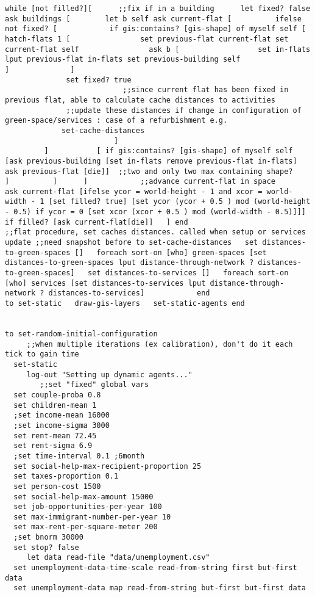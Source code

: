 \documentclass[english]{article}
\begin{document}
\begin{lstlisting}[basicstyle={\scriptsize}]
while [not filled?][      ;;fix if in a building      let fixed? false      ask buildings [        let b self ask current-flat [          ifelse not fixed? [            if gis:contains? [gis-shape] of myself self [              hatch-flats 1 [                set previous-flat current-flat set current-flat self                ask b [                  set in-flats lput previous-flat in-flats set previous-building self                ]              ]
              set fixed? true
                           ;;since current flat has been fixed in previous flat, able to calculate cache distances to activities
              ;;update these distances if change in configuration of green-space/services : case of a refurbishment e.g.
             set-cache-distances
                         ]
         ]           [ if gis:contains? [gis-shape] of myself self [ask previous-building [set in-flats remove previous-flat in-flats] ask previous-flat [die]]  ;;two and only two max containing shape?               ]          ]      ]            ;;advance current-flat in space      ask current-flat [ifelse ycor = world-height - 1 and xcor = world-width - 1 [set filled? true] [set ycor (ycor + 0.5 ) mod (world-height - 0.5) if ycor = 0 [set xcor (xcor + 0.5 ) mod (world-width - 0.5)]]]      if filled? [ask current-flat[die]]   ] end
;;flat procedure, set caches distances. called when setup or services update ;;need snapshot before to set-cache-distances   set distances-to-green-spaces []   foreach sort-on [who] green-spaces [set distances-to-green-spaces lput distance-through-network ? distances-to-green-spaces]   set distances-to-services []   foreach sort-on [who] services [set distances-to-services lput distance-through-network ? distances-to-services]            end
to set-static   draw-gis-layers   set-static-agents end


to set-random-initial-configuration
     ;;when multiple iterations (ex calibration), don't do it each tick to gain time
  set-static
     log-out "Setting up dynamic agents..."
        ;;set "fixed" global vars
  set couple-proba 0.8
  set children-mean 1
  ;set income-mean 16000
  ;set income-sigma 3000
  set rent-mean 72.45
  set rent-sigma 6.9
  ;set time-interval 0.1 ;6month
  set social-help-max-recipient-proportion 25
  set taxes-proportion 0.1
  set person-cost 1500
  set social-help-max-amount 15000
  set job-opportunities-per-year 100
  set max-immigrant-number-per-year 10
  set max-rent-per-square-meter 200
  ;set bnorm 30000
  set stop? false
     let data read-file "data/unemployment.csv"
  set unemployment-data-time-scale read-from-string first but-first data
  set unemployment-data map read-from-string but-first but-first data


\end{lstlisting}
\end{document}
